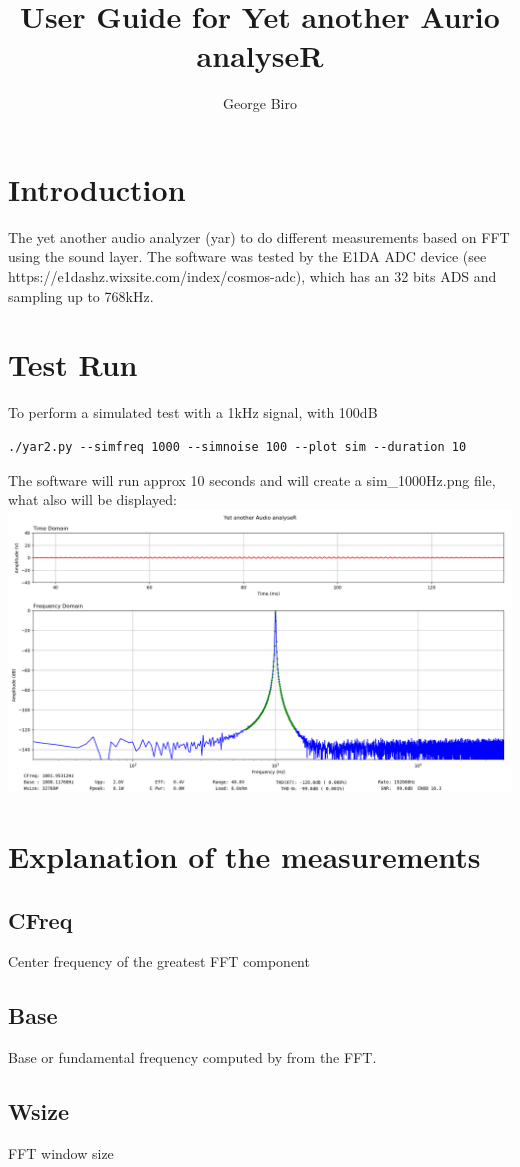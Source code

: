 \documentclass[10pt,a4paper]{article}
\author{George Biro}
\title{User Guide for Yet another Aurio analyseR}
\begin{document}
\maketitle
\tableofcontents
\pagebreak
\section{Introduction}
The yet another audio analyzer (yar) to do different measurements based on FFT using the sound layer. The software was tested by the E1DA ADC device (see https://e1dashz.wixsite.com/index/cosmos-adc), which has an 32 bits ADS and sampling up to 768kHz.
\section{Test Run}
To perform a simulated test with a 1kHz signal, with 100dB
\begin{verbatim}
./yar2.py --simfreq 1000 --simnoise 100 --plot sim --duration 10
\end{verbatim}
The software will run approx 10 seconds and will create a sim\_1000Hz.png file, what also will be displayed:
\includegraphics[width=\textwidth]{sim_1000Hz.png}
\section{Explanation of the measurements}
\subsection{CFreq}
Center frequency of the greatest FFT component
\subsection{Base}
Base or fundamental frequency computed by from the FFT.
\subsection{Wsize}
FFT window size
\end{document}
